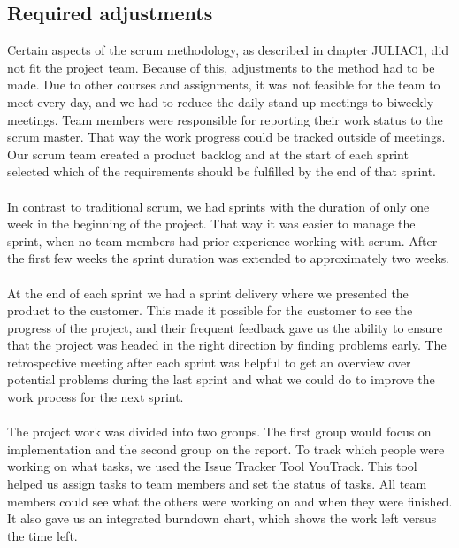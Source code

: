 \subsection*{Required adjustments}
\label{subsec:IntroMethodAdjust}
Certain aspects of the scrum methodology, as described in chapter JULIAC1, did not fit the project team. Because of this, adjustments to the method had to be made. Due to other courses and assignments, it was not feasible for the team to meet every day, and we had to reduce the daily stand up meetings to biweekly meetings. Team members were responsible for reporting their work status to the scrum master. That way the work progress could be tracked outside of meetings. Our scrum team created a product backlog and at the start of each sprint selected which of the requirements should be fulfilled by the end of that sprint.

\paragraph{} In contrast to traditional scrum, we had sprints with the duration of only one week in the beginning of the project. That way it was easier to manage the sprint, when no team members had prior experience working with scrum. After the first few weeks the sprint duration was extended to approximately two weeks. 

\paragraph{} At the end of each sprint we had a sprint delivery where we presented the product to the customer. This made it possible for the customer to see the progress of the project, and their frequent feedback gave us the ability to ensure that the project was headed in the right direction by finding problems early. The retrospective meeting after each sprint was helpful to get an overview over potential problems during the last sprint and what we could do to improve the work process for the next sprint. 

\paragraph{} The project work was divided into two groups. The first group would focus on implementation and the second group on the report. To track which people were working on what tasks, we used the Issue Tracker Tool YouTrack. This tool helped us assign tasks to team members and set the status of tasks. All team members could see what the others were working on and when they were finished. It also gave us an integrated burndown chart, which shows the work left versus the time left.


